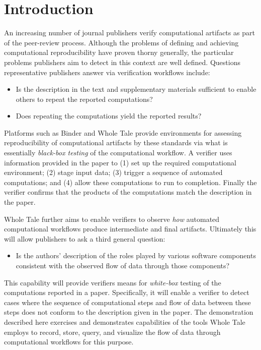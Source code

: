 \section{Introduction}

An increasing number of journal publishers verify computational artifacts as part of the peer-review process. Although the problems of defining and achieving computational reproducibility have proven thorny generally, the particular problems publishers aim to detect in this context are well defined. Questions representative publishers answer via verification workflows include:

\begin{itemize}[label=\raisebox{0.25ex}{\tiny$\bullet$}]

\item Is the description in the text and supplementary materials sufficient to enable others to repeat the reported computations?

\item Does repeating the computations yield the reported results?

\end{itemize}

Platforms such as Binder \cite{Binder_2018} and Whole Tale  \cite{brinckman2019computing} provide environments for assessing reproducibility of computational artifacts by these standards via what is essentially \emph{black-box testing} of the computational workflow. A verifier uses information provided in the paper to (1) set up the required computational environment; (2) stage input data; (3) trigger a sequence of automated computations; and (4) allow these computations to run to completion. Finally the verifier confirms that the products of the computations match the description in the paper.

Whole Tale further aims to enable verifiers to observe \emph{how} automated computational workflows produce intermediate and final artifacts. Ultimately this will allow publishers to ask a third general question:

\begin{itemize}[label=\raisebox{0.25ex}{\tiny$\bullet$}]

\item Is the authors' description of the roles played by various software components consistent with the observed flow of data through those components?

\end{itemize}

This capability will provide verifiers means for \emph{white-box} testing of the computations reported in a paper. Specifically, it will enable a verifier to detect cases where the sequence of computational steps and flow of data between these steps does not conform to the description given in the paper. The demonstration described here exercises and demonstrates capabilities of the tools Whole Tale employs to record, store, query, and visualize the flow of data through computational workflows for this purpose.








